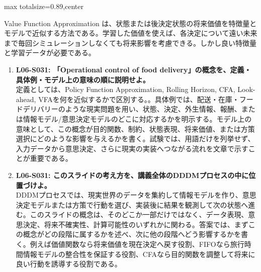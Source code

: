 \begin{minipage}[t]{0.58\textwidth}
\begin{adjustbox}{max totalsize={\textwidth}{0.89\textheight},center}
\begin{minipage}{\textwidth}
Value Function Approximation は、状態または後決定状態の将来価値を特徴量とモデルで近似する方法である。学習した価値を使えば、各決定について遠い未来まで毎回シミュレーションしなくても将来影響を考慮できる。しかし良い特徴量と学習データが必要である。\par{}\begin{enumerate}\item \textbf{L06-S031: 「Operational control of food delivery」の概念を、定義・具体例・モデル上の意味の順に説明せよ。}\\定義としては、Policy Function Approximation, Rolling Horizon, CFA, Look-ahead, VFAを何を近似するかで区別する。。具体例では、配送・在庫・フードデリバリーのような現実問題を用い、状態、決定、外生情報、報酬、または情報モデル/意思決定モデルのどこに対応するかを明示する。モデル上の意味として、この概念が目的関数、制約、状態表現、将来価値、または方策選択にどのような影響を与えるかを書く。試験では、用語だけを列挙せず、入力データから意思決定、さらに現実の実装へつながる流れを文章で示すことが重要である。\item \textbf{L06-S031: このスライドの考え方を、講義全体のDDDMプロセスの中に位置づけよ。}\\DDDMプロセスでは、現実世界のデータを集約して情報モデルを作り、意思決定モデルまたは方策で行動を選び、実装後に結果を観測して次の状態へ進む。このスライドの概念は、そのどこか一部だけではなく、データ表現、意思決定、将来不確実性、計算可能性のいずれかに関わる。答案では、まずこの概念がどの段階に属するかを述べ、次に他の段階へどう影響するかを書く。例えば価値関数なら将来価値を現在決定へ戻す役割、FIFOなら旅行時間情報モデルの整合性を保証する役割、CFAなら目的関数を調整して将来に良い行動を誘導する役割である。\end{enumerate}
\end{minipage}
\end{adjustbox}
\end{minipage}


